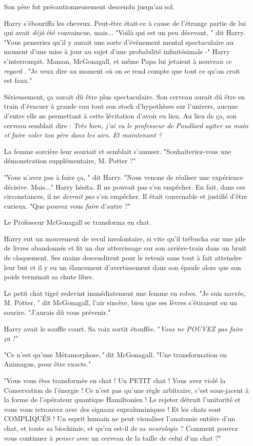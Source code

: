 Son père fut précautionneusement descendu jusqu'au sol.

Harry s'ébouriffa les cheveux. Peut-être était-ce à cause de l'étrange partie de lui qui avait \emph{déjà}  été convaincue, mais... "Voilà qui est un peu décevant, " dit Harry. "Vous penseriez qu'il y aurait une sorte d'événement mental spectaculaire au moment d'une mise à jour au sujet d'une probabilité infinitésimale -" Harry s'interrompit. Maman, McGonagall, et même Papa lui jetaient à nouveau \emph{ce regard} . "Je veux dire au moment où on se rend compte que tout ce qu'on croit est faux."

Sérieusement, ça aurait dû être plus spectaculaire. Son cerveau aurait dû être en train d'évacuer à grande eau tout son stock d'hypothèses sur l'univers, aucune d'entre elle ne permettant à cette lévitation d'avoir eu lieu. Au lieu de ça, son cerveau semblait dire : \emph{Très bien, j'ai vu le professeur de Poudlard agiter sa main et faire voler ton père dans les airs. Et maintenant ?} 

La femme sorcière leur souriait et semblait s'amuser. "Souhaiteriez-vous une démonstration supplémentaire, M. Potter ?"

"Vous n'avez pas à faire ça, " dit Harry. "Nous venons de réaliser une expérience décisive. Mais..." Harry hésita. Il ne pouvait pas s'en empêcher. En fait, dans ces circonstances, il ne \emph{devrait pas}  s'en empêcher. Il était convenable et justifié d'être curieux. "Que pouvez vous \emph{faire}  d'autre ?"

Le Professeur McGonagall se transforma en chat.

Harry eut un mouvement de recul involontaire, si vite qu'il trébucha sur une pile de livres abandonnés et fit un dur atterrissage sur son arrière-train dans un bruit de claquement. Ses mains descendirent pour le retenir sans tout à fait atteindre leur but et il y eu un élancement d'avertissement dans son épaule alors que son poids terminait sa chute libre.

Le petit chat tigré redevint immédiatement une femme en robes. "Je suis navrée, M. Potter, " dit McGonagall, l'air sincère, bien que ses lèvres s'étiraient en un sourire. "J'aurais dû vous prévenir."

Harry avait le souffle court. Sa voix sortit étouffée. "\emph{Vous ne POUVEZ pas faire ça !"} 

"Ce n'est qu'une Métamorphose,\emph{"}  dit McGonagall. "Une transformation en Animagus, pour être exacte."

"Vous vous êtes transformée en chat ! Un PETIT chat ! Vous avez violé la Conservation de l'énergie ! Ce n'est pas qu'une règle arbitraire, c'est sous-jacent à la forme de l'opérateur quantique Hamiltonien ! Le rejeter détruit l'unitarité et vous vous retrouvez avec des signaux supraluminiques ! Et les chats sont COMPLIQUÉS ! Un esprit humain ne peut visualiser l'anatomie entière d'un chat, et toute sa biochimie, et qu'en est-il de sa \emph{neurologie } ? Comment pouvez vous continuer à \emph{penser}  avec un cerveau de la taille de celui d'un chat ?"

